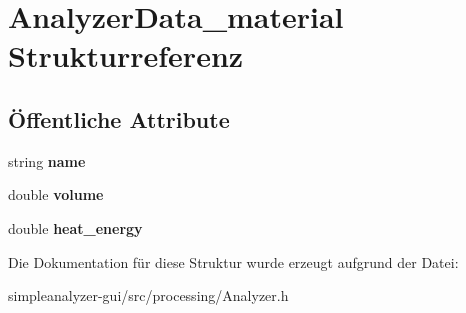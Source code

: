 \hypertarget{structAnalyzerData__material}{\section{Analyzer\-Data\-\_\-material Strukturreferenz}
\label{structAnalyzerData__material}
}
\subsection*{Öffentliche Attribute}
\begin{DoxyCompactItemize}
\item 
\hypertarget{structAnalyzerData__material_afbc49171cd5315bdf38fd8e8454a0093}{string {\bfseries name}}\label{structAnalyzerData__material_afbc49171cd5315bdf38fd8e8454a0093}

\item 
\hypertarget{structAnalyzerData__material_ac0c4a748d346a87fa4fb0ebd2b6ad523}{double {\bfseries volume}}\label{structAnalyzerData__material_ac0c4a748d346a87fa4fb0ebd2b6ad523}

\item 
\hypertarget{structAnalyzerData__material_ab1c86b6ab06995abf02c3108386686f6}{double {\bfseries heat\-\_\-energy}}\label{structAnalyzerData__material_ab1c86b6ab06995abf02c3108386686f6}

\end{DoxyCompactItemize}


Die Dokumentation für diese Struktur wurde erzeugt aufgrund der Datei\-:\begin{DoxyCompactItemize}
\item 
simpleanalyzer-\/gui/src/processing/Analyzer.\-h\end{DoxyCompactItemize}

